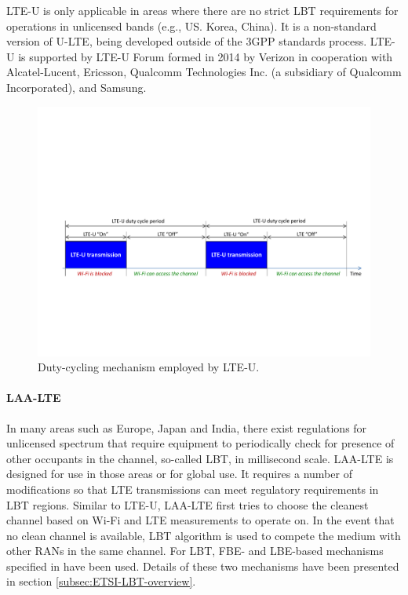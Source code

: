 LTE-U is only applicable in areas where there are no strict LBT requirements for operations in unlicensed bands (e.g., US. Korea, China). It is a non-standard version of U-LTE, being developed outside of the 3GPP standards process. LTE-U is supported by LTE-U Forum formed in 2014 by Verizon in cooperation with Alcatel-Lucent, Ericsson, Qualcomm Technologies Inc. (a subsidiary of Qualcomm Incorporated), and Samsung.

\begin{figure}[!t]
	\centering
	\includegraphics[width=0.95\columnwidth]{figures2/LTE-U}
	\caption{Duty-cycling mechanism employed by LTE-U.}
	\label{figs:LTE-U}
\end{figure}

\paragraph{LAA-LTE}

\noindent In many areas such as Europe, Japan and India, there exist regulations for unlicensed spectrum that require equipment to periodically check for presence of other occupants in the channel, so-called LBT, in millisecond scale. LAA-LTE is designed for use in those areas or for global use. It requires a number of modifications so that LTE transmissions can meet regulatory requirements in LBT regions. Similar to LTE-U, LAA-LTE first tries to choose the cleanest channel based on Wi-Fi and LTE measurements to operate on. In the event that no clean channel is available, LBT algorithm is used to compete the medium with other RANs in the same channel. For LBT, FBE- and LBE-based mechanisms specified in \cite{LBT-ETSI-2014} have been used. Details of these two mechanisms have been presented in section \ref{subsec:ETSI-LBT-overview}.

